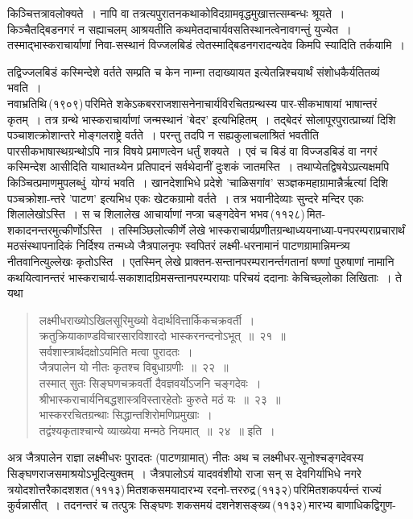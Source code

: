 \documentclass[11pt, openany]{book}
\begin{document}
\begin{sloppypar}
किञ्चित्तत्रावलोक्यते~। नापि वा तत्रत्यपुरातनकथाकोविदग्रामवृद्धमुखात्तत्सम्बन्धः श्रूयते~। किञ्चैतद्बिडनगरं न सह्याचलम् आश्रयतीति कथमेतदाचार्यवसतिस्थानत्वेनावगन्तुं युज्येत~। तस्माद्भास्कराचार्याणां निवा-सस्थानं विज्जलबिडं त्वेतस्माद्बिडनगरादन्यदेव किमपि स्यादिति तर्कयामि~।
\end{sloppypar}

\newpage

\begin{sloppypar}
\noindent तद्विज्जलबिडं कस्मिन्देशे वर्तते सम्प्रति च केन नाम्ना तदाख्यायत इत्येतन्निश्चयार्थं संशोधकैर्यतितव्यं भवति~।\\

नवाभ्रतिथि\textendash \,(१९०९)\textendash \,परिमिते शकेऽकबरराजशासनेनाचार्यविरचितग्रन्थस्य पार-सीकभाषायां भाषान्तरं कृतम्~। तत्र ग्रन्थे भास्कराचार्याणां जन्मस्थानं 'बेदर' इत्यभिहितम्~। तद्बेदरं सोलापूरपुरात्प्राच्यां दिशि पञ्चाशत्क्रोशान्तरे मोङ्गलराष्ट्रे वर्तते~। परन्तु तदपि न सह्यकुलाचलाश्रितं भवतीति पारसीकभाषास्थग्रन्थोऽपि नात्र विषये प्रमाणत्वेन धर्तुं शक्यते~। एवं च बिडं वा विज्जडबिडं वा नगरं कस्मिन्देश आसीदिति याथातथ्येन प्रतिपादनं सर्वथेदानीं दुःशकं जातमस्ति~। तथाप्येतद्विषयेऽप्रत्यक्षमपि किञ्चित्प्रमाणमुपलब्धुं~योग्यं भवति~। खानदेशाभिधे प्रदेशे 'चाळिसगांव' सञ्ज्ञकमहाग्रामान्नैर्ऋत्यां दिशि पञ्चक्रोशा-न्तरे 'पाटण' इत्यभिध एकः खेटकग्रामो वर्तते~। तत्र भवानीदेव्याः सुन्दरे मन्दिर एकः शिलालेखोऽस्ति~। स च शिलालेख आचार्याणां नप्त्रा चङ्गदेवेन भभव\textendash \,(११२८)\textendash \,मित-शकादनन्तरमुत्कीर्णोऽस्ति~। तस्मिञ्छिलोत्कीर्णे लेखे भास्कराचार्यप्रणीतग्रन्थाध्ययनाध्या-पनपरम्पराप्रचारार्थं मठसंस्थापनादिकं निर्दिश्य तन्मध्ये जैत्रपालनृपः स्वपितरं लक्ष्मी-धरनामानं पाटणग्रामान्निमन्त्र्य नीतवानित्युल्लेखः कृतोऽस्ति~। एतस्मिन् लेखे प्राक्तन-सन्तानपरम्परानर्न्तगतानां षण्णां पुरुषाणां नामानि कथयित्वानन्तरं भास्कराचार्य-सकाशादग्रिमसन्तानपरम्परायाः परिचयं ददानाः केचिच्छ्लोका लिखिताः~। ते यथा\textendash 

\begin{quote}
{\color{violet}लक्ष्मीधराख्योऽखिलसूरिमुख्यो वेदार्थवित्तार्किकचक्रवर्ती~।\\
क्रतुक्रियाकाण्डविचारसारविशारदो भास्करनन्दनोऽभूत्~॥~२१~॥\\
सर्वशास्त्रार्थदक्षोऽयमिति मत्वा पुरादतः~।\\
जैत्रपालेन यो नीतः कृतश्च विबुधाग्रणीः~॥~२२~॥\\    
तस्मात् सुतः सिङ्घणचक्रवर्ती दैवज्ञवर्योऽजनि चङ्गदेवः~।\\    
श्रीभास्कराचार्यनिबद्धशास्त्रविस्तारहेतोः कुरुते मठं यः~॥~२३~॥ \\
भास्कररचितग्रन्थाः सिद्धान्तशिरोमणिप्रमुखाः~।\\    
तद्वंश्यकृताश्चान्ये व्याख्येया मन्मठे नियमात्~॥~२४~॥} इति~।
\end{quote}

अत्र जैत्रपालेन राज्ञा लक्ष्मीधरः पुरादतः (पाटणग्रामात्) नीतः अथ च लक्ष्मीधर-सूनोश्चङ्गदेवस्य सिङ्घणराजसमाश्रयोऽभूदित्युक्तम्~। जैत्रपालोऽयं यादववंशीयो राजा सन् स देवगिर्याभिधे नगरे त्रयोदशोत्तरैकादशशत\textendash \,(१११३)\textendash \,मितशकसमयादारभ्य रदनो-त्तररुद्र\textendash \,(११३२)\textendash \,परिमितशकपर्यन्तं राज्यं कुर्वन्नासीत्~। तदनन्तरं च तत्पुत्रः सिङ्घणः शकसमयं दशनेशसङ्ख्य\textendash \,(११३२)\textendash \,मारभ्य बाणाधिकद्विगुण-
\end{sloppypar}
\end{document}
